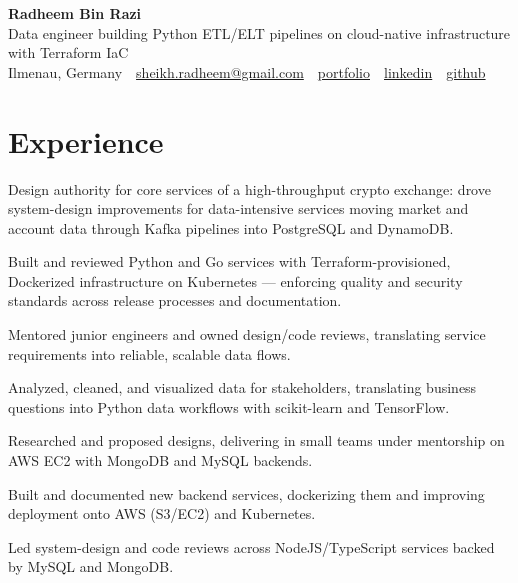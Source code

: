 \documentclass[11pt,a4paper]{resume}
\makeatletter
\newcommand{\Portfolio}{https://radheem.github.io/my-cv}
\newcommand{\PortfolioText}{portfolio}
\newcommand{\GitHub}{https://github.com/radheem}
\newcommand{\LinkedIn}{https://www.linkedin.com/in/radheem-razi}
\newcommand{\Email}{sheikh.radheem@gmail.com}
\makeatother
\begin{document}
\begin{center}
  {\huge\bfseries Radheem Bin Razi}\\[3pt]
  {\large Data engineer building Python ETL/ELT pipelines on cloud-native infrastructure with Terraform IaC}\\[6pt]
  \small
  Ilmenau, Germany \,\textbar\,
  \href{mailto:\Email}{\Email} \,\textbar\,
  \href{\Portfolio}{\PortfolioText} \,\textbar\,
  \href{\LinkedIn}{linkedin} \,\textbar\,
  \href{\GitHub}{github}
\end{center}
\vspace{2pt}

\section{Experience}

\bullets
  \item Design authority for core services of a high-throughput crypto exchange: drove system-design improvements for data-intensive services moving market and account data through Kafka pipelines into PostgreSQL and DynamoDB.
  \item Built and reviewed Python and Go services with Terraform-provisioned, Dockerized infrastructure on Kubernetes — enforcing quality and security standards across release processes and documentation.
  \item Mentored junior engineers and owned design/code reviews, translating service requirements into reliable, scalable data flows.
\bulletsend
\vspace{3pt}
\bullets
  \item Analyzed, cleaned, and visualized data for stakeholders, translating business questions into Python data workflows with scikit-learn and TensorFlow.
  \item Researched and proposed designs, delivering in small teams under mentorship on AWS EC2 with MongoDB and MySQL backends.
\bulletsend
\vspace{3pt}
\bullets
  \item Built and documented new backend services, dockerizing them and improving deployment onto AWS (S3/EC2) and Kubernetes.
  \item Led system-design and code reviews across NodeJS/TypeScript services backed by MySQL and MongoDB.
\bulletsend
\vspace{3pt}
\end{document}
